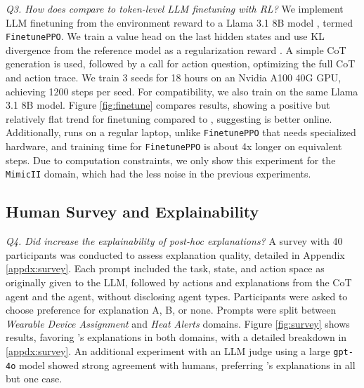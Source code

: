 \emph{Q3. How does \rbrl compare to token-level LLM finetuning with RL?} \quad  We implement LLM finetuning from the environment reward to a Llama 3.1 8B model \cite{meta2024llama3.1}, termed \texttt{FinetunePPO}. We train a value head on the last hidden states and use KL divergence from the reference model as a regularization reward \cite{ziegler2019fine}. A simple CoT generation is used, followed by a call for action question, optimizing the full CoT and action trace. We train 3 seeds for 18 hours on an Nvidia A100 40G GPU, achieving 1200 steps per seed. For compatibility, we also train \rbrl on the same Llama 3.1 8B model. Figure \ref{fig:finetune} compares results, showing a positive but relatively flat trend for finetuning compared to \rbrl, suggesting \rbrl is better online. Additionally, \rbrl runs on a regular laptop, unlike \texttt{FinetunePPO} that needs specialized hardware, and training time for \texttt{FinetunePPO} is about 4x longer on equivalent steps. Due to computation constraints, we only show this experiment for the \texttt{MimicII} domain, which had the less noise in the previous experiments.


 




























\subsection{Human Survey and Explainability}
 

\emph{Q4. Did \rbrl increase the explainability of post-hoc explanations?}  \quad 
A survey with 40 participants was conducted to assess explanation quality, detailed in Appendix \ref{appdx:survey}. Each prompt included the task, state, and action space as originally given to the LLM, followed by actions and explanations from the CoT agent and the \rbrl agent, without disclosing agent types. Participants were asked to choose preference for explanation A, B, or none. Prompts were split between \textit{Wearable Device Assignment} and \textit{Heat Alerts} domains. Figure \ref{fig:survey} shows results, favoring \rbrl's explanations in both domains, with a detailed breakdown in \ref{appdx:survey}. An additional experiment with an LLM judge \cite{gu2024survey} using a large \texttt{gpt-4o} model \cite{openai2024gpt4o} showed strong agreement with humans, preferring \rbrl's explanations in all but one case.


